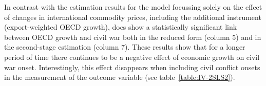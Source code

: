 \documentclass[a4paper,11pt]{article}
\begin{document}
In contrast with the estimation results for the model focussing solely on the effect of changes in international commodity prices, including the additional instrument (export-weighted OECD growth), does show a statistically significant link between OECD growth and civil war both in the reduced form (column 5) and in the second-stage estimation (column 7).
These results show that for a longer period of time there continues to be a negative effect of economic growth on civil war onset. 
Interestingly, this effect disappears when including civil conflict onsets in the measurement of the outcome variable (see table~\ref{table:IV-2SLS2}).\\
\begin{table}[!h] \centering
  \caption{Commodity prices, export demand, and civil war onset 1981-2013}
  \label{table:IV-2SLS}
\end{table}
\end{document}
